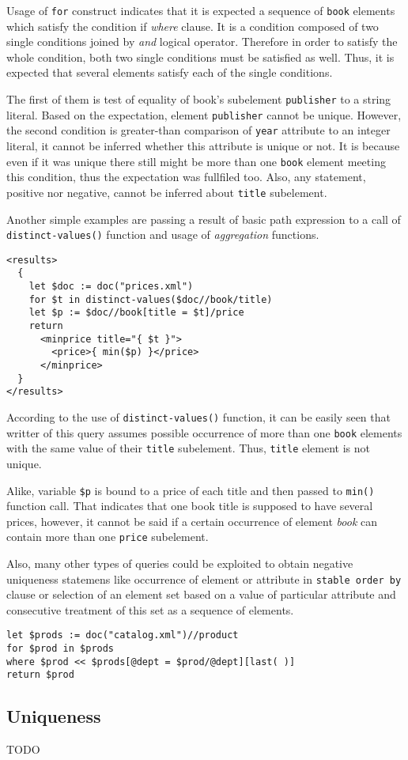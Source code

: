 Usage of \texttt{for} construct indicates that it is expected a sequence of \texttt{book} elements which satisfy the condition if \emph{where} clause. It is a condition composed of two single conditions joined by \emph{and} logical operator. Therefore in order to satisfy the whole condition, both two single conditions must be satisfied as well. Thus, it is expected that several elements satisfy each of the single conditions.

The first of them is test of equality of book's subelement \texttt{publisher} to a string literal. Based on the expectation, element \texttt{publisher} cannot be unique. However, the second condition is greater-than comparison of \texttt{year} attribute to an integer literal, it cannot be inferred whether this attribute is unique or not. It is because even if it was unique there still might be more than one \texttt{book} element meeting this condition, thus the expectation was fullfiled too. Also, any statement, positive nor negative, cannot be inferred about \texttt{title} subelement.

Another simple examples are passing a result of basic path expression to a call of \texttt{distinct-values()} function and usage of \emph{aggregation} functions.

\begin{verbatim}
<results>
  {
    let $doc := doc("prices.xml")
    for $t in distinct-values($doc//book/title)
    let $p := $doc//book[title = $t]/price
    return
      <minprice title="{ $t }">
        <price>{ min($p) }</price>
      </minprice>
  }
</results>
\end{verbatim}

According to the use of \texttt{distinct-values()} function, it can be easily seen that writter of this query assumes possible occurrence of more than one \texttt{book} elements with the same value of their \texttt{title} subelement. Thus, \texttt{title} element is not unique.

Alike, variable \texttt{\$p} is bound to a price of each title and then passed to \texttt{min()} function call. That indicates that one book title is supposed to have several prices, however, it cannot be said if a certain occurrence of element \emph{book} can contain more than one \texttt{price} subelement.

Also, many other types of queries could be exploited to obtain negative uniqueness statemens like occurrence of element or attribute in \texttt{stable order by} clause or selection of an element set based on a value of particular attribute and consecutive treatment of this set as a sequence of elements.

\begin{verbatim}
let $prods := doc("catalog.xml")//product 
for $prod in $prods 
where $prod << $prods[@dept = $prod/@dept][last( )] 
return $prod 
\end{verbatim}

\subsection{Uniqueness}
TODO